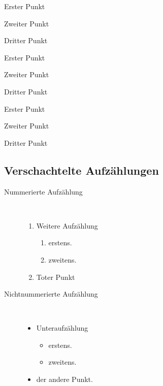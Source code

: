 \begin{compactenum}[(i)]
    \item{Erster Punkt}
    \item{Zweiter Punkt}
    \item{Dritter Punkt}
\end{compactenum}

\begin{compactenum}[(I)]
    \item{Erster Punkt}
    \item{Zweiter Punkt}
    \item{Dritter Punkt}
\end{compactenum}

\begin{compactenum}[(a)]
    \item{Erster Punkt}
    \item{Zweiter Punkt}
    \item{Dritter Punkt}
\end{compactenum}

\subsection{Verschachtelte Aufzählungen}

\begin{description}
    \item[Nummerierte Aufzählung]~\par
    \begin{enumerate}
        \item Weitere Aufzählung
              \begin{enumerate}
                  \item erstens.
                  \item zweitens.
              \end{enumerate}
        \item Toter Punkt
    \end{enumerate}

    \item[Nichtnummerierte Aufzählung]~\par
    \begin{itemize}
        \item Unteraufzählung
              \begin{itemize}
                  \item erstens.
                  \item zweitens.
              \end{itemize}
        \item der andere Punkt.
    \end{itemize}
\end{description}

